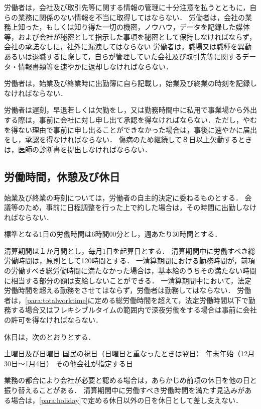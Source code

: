 \documentclass[11pt,a4paper]{jsarticle}
\begin{document}
労働者は，会社及び取引先等に関する情報の管理に十分注意を払うとともに，自らの業務に関係のない情報を不当に取得してはならない．
\label{para:confidentiality}
\term
労働者は，会社の業務上知った，もしくは知り得た一切の機密，ノウハウ，データを記録した媒体等，および会社が秘密として指示した事項を秘密として保持しなければならず，会社の承諾なしに，社外に漏洩してはならない
\term
労働者は，職場又は職種を異動あるいは退職するに際して，自らが管理していた会社及び取引先等に関するデータ・情報書類等を速やかに返却しなければならない．

労働者は，始業及び終業時に出勤簿に自ら記載し，始業及び終業の時刻を記録しなければならない．

労働者は遅刻，早退若しくは欠勤をし，又は勤務時間中に私用で事業場から外出する際は，事前に会社に対し申し出て承認を得なければならない．ただし，やむを得ない理由で事前に申し出ることができなかった場合は，事後に速やかに届出をし，承認を得なければならない．
\term
傷病のため継続して８日以上欠勤するときは，医師の診断書を提出しなければならない．




\subsection{労働時間，休憩及び休日}

始業及び終業の時刻については，労働者の自主的決定に委ねるものとする．
\term
会議等のため，事前に日程調整を行った上で約した場合は，その時間に出勤しなければならない．

標準となる1日の労働時間は6時間00分とし，週あたり30時間とする．

清算期間は１か月間とし，毎月1日を起算日とする． 
\term
清算期間中に労働すべき総労働時間は，原則として120時間とする．
\term
一清算期間における勤務時間が，前項の労働すべき総労働時間に満たなかった場合は，基本給のうちその満たない時間に相当する部分の額は支給しないことができる．
\label{para:totalworktime}
\term
一清算期間中において，法定労働時間を超える勤務をさせてはならず，労働者は勤務してはならない．
\term
労働者は，\ref{para:totalworktime}に定める総労働時間を超えて，法定労働時間以下で勤務する場合又はフレキシブルタイムの範囲内で深夜労働をする場合は事前に会社の許可を得なければならない．

休日は，次のとおりとする．
\label{para:holiday}
\begin{enumerate}
	\itm 土曜日及び日曜日
	\itm 国民の祝日（日曜日と重なったときは翌日）
	\itm 年末年始（12月30日～1月4日）
	\itm その他会社が指定する日
\end{enumerate}
\term
業務の都合により会社が必要と認める場合は，あらかじめ前項の休日を他の日と振り替えることがある．
\term
清算期間中に労働すべき労働時間を満たす見込みがある場合は，\ref{para:holiday}で定める休日以外の日を休日として差し支えない． 
\end{document}
